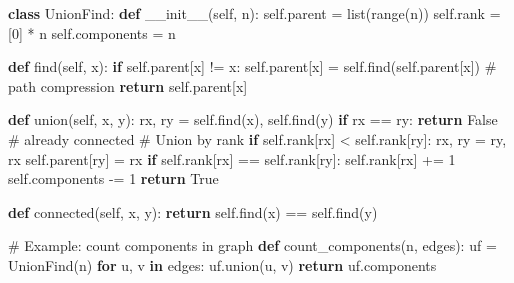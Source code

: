 \documentclass[11pt]{article}
\newenvironment{Shaded}{\begin{snugshade}}{\end{snugshade}}
\newcommand{\BuiltInTok}[1]{\textcolor[rgb]{0.50,0.55,0.55}{#1}}
\newcommand{\CommentTok}[1]{\textcolor[rgb]{0.48,0.49,0.49}{#1}}
\newcommand{\ControlFlowTok}[1]{\textcolor[rgb]{0.99,0.74,0.29}{\textbf{#1}}}
\newcommand{\DecValTok}[1]{\textcolor[rgb]{0.96,0.45,0.00}{#1}}
\newcommand{\FunctionTok}[1]{\textcolor[rgb]{0.56,0.27,0.68}{#1}}
\newcommand{\KeywordTok}[1]{\textcolor[rgb]{0.81,0.81,0.76}{\textbf{#1}}}
\newcommand{\NormalTok}[1]{\textcolor[rgb]{0.81,0.81,0.76}{#1}}
\newcommand{\OperatorTok}[1]{\textcolor[rgb]{0.81,0.81,0.76}{#1}}
\newcommand{\VariableTok}[1]{\textcolor[rgb]{0.15,0.68,0.68}{#1}}
\begin{document}
\begin{Shaded}
\begin{Highlighting}[]
\KeywordTok{class}\NormalTok{ UnionFind:}
    \KeywordTok{def} \FunctionTok{\_\_init\_\_}\NormalTok{(}\VariableTok{self}\NormalTok{, n):}
        \VariableTok{self}\NormalTok{.parent }\OperatorTok{=} \BuiltInTok{list}\NormalTok{(}\BuiltInTok{range}\NormalTok{(n))}
        \VariableTok{self}\NormalTok{.rank }\OperatorTok{=}\NormalTok{ [}\DecValTok{0}\NormalTok{] }\OperatorTok{*}\NormalTok{ n}
        \VariableTok{self}\NormalTok{.components }\OperatorTok{=}\NormalTok{ n}

    \KeywordTok{def}\NormalTok{ find(}\VariableTok{self}\NormalTok{, x):}
        \ControlFlowTok{if} \VariableTok{self}\NormalTok{.parent[x] }\OperatorTok{!=}\NormalTok{ x:}
            \VariableTok{self}\NormalTok{.parent[x] }\OperatorTok{=} \VariableTok{self}\NormalTok{.find(}\VariableTok{self}\NormalTok{.parent[x])  }\CommentTok{\# path compression}
        \ControlFlowTok{return} \VariableTok{self}\NormalTok{.parent[x]}

    \KeywordTok{def}\NormalTok{ union(}\VariableTok{self}\NormalTok{, x, y):}
\NormalTok{        rx, ry }\OperatorTok{=} \VariableTok{self}\NormalTok{.find(x), }\VariableTok{self}\NormalTok{.find(y)}
        \ControlFlowTok{if}\NormalTok{ rx }\OperatorTok{==}\NormalTok{ ry: }\ControlFlowTok{return} \VariableTok{False}  \CommentTok{\# already connected}
        \CommentTok{\# Union by rank}
        \ControlFlowTok{if} \VariableTok{self}\NormalTok{.rank[rx] }\OperatorTok{\textless{}} \VariableTok{self}\NormalTok{.rank[ry]:}
\NormalTok{            rx, ry }\OperatorTok{=}\NormalTok{ ry, rx}
        \VariableTok{self}\NormalTok{.parent[ry] }\OperatorTok{=}\NormalTok{ rx}
        \ControlFlowTok{if} \VariableTok{self}\NormalTok{.rank[rx] }\OperatorTok{==} \VariableTok{self}\NormalTok{.rank[ry]:}
            \VariableTok{self}\NormalTok{.rank[rx] }\OperatorTok{+=} \DecValTok{1}
        \VariableTok{self}\NormalTok{.components }\OperatorTok{{-}=} \DecValTok{1}
        \ControlFlowTok{return} \VariableTok{True}

    \KeywordTok{def}\NormalTok{ connected(}\VariableTok{self}\NormalTok{, x, y):}
        \ControlFlowTok{return} \VariableTok{self}\NormalTok{.find(x) }\OperatorTok{==} \VariableTok{self}\NormalTok{.find(y)}

\CommentTok{\# Example: count components in graph}
\KeywordTok{def}\NormalTok{ count\_components(n, edges):}
\NormalTok{    uf }\OperatorTok{=}\NormalTok{ UnionFind(n)}
    \ControlFlowTok{for}\NormalTok{ u, v }\KeywordTok{in}\NormalTok{ edges:}
\NormalTok{        uf.union(u, v)}
    \ControlFlowTok{return}\NormalTok{ uf.components}


\end{Highlighting}
\end{Shaded}
\end{document}
